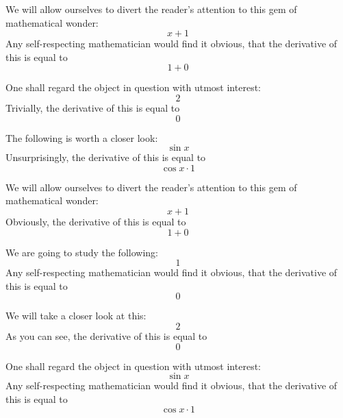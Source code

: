 \documentclass{article}
\begin{document}
We will allow ourselves to divert the reader's attention to this gem of mathematical wonder:
\begin{equation}
x + 1 
\end{equation}
Any self-respecting mathematician would find it obvious, that the derivative of this is equal to
\begin{equation}
1 + 0 
\end{equation}

One shall regard the object in question with utmost interest:
\begin{equation}
2 
\end{equation}
Trivially, the derivative of this is equal to
\begin{equation}
0 
\end{equation}

The following is worth a closer look:
\begin{equation}
\sin x 
\end{equation}
Unsurprisingly, the derivative of this is equal to
\begin{equation}
\cos x \cdot 1 
\end{equation}

We will allow ourselves to divert the reader's attention to this gem of mathematical wonder:
\begin{equation}
x + 1 
\end{equation}
Obviously, the derivative of this is equal to
\begin{equation}
1 + 0 
\end{equation}

We are going to study the following:
\begin{equation}
1 
\end{equation}
Any self-respecting mathematician would find it obvious, that the derivative of this is equal to
\begin{equation}
0 
\end{equation}

We will take a closer look at this:
\begin{equation}
2 
\end{equation}
As you can see, the derivative of this is equal to
\begin{equation}
0 
\end{equation}

One shall regard the object in question with utmost interest:
\begin{equation}
\sin x 
\end{equation}
Any self-respecting mathematician would find it obvious, that the derivative of this is equal to
\begin{equation}
\cos x \cdot 1 
\end{equation}
\end{document}
